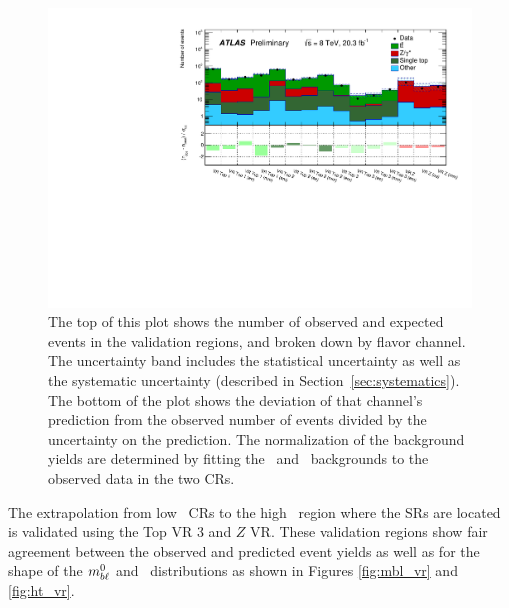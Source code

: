 \begin{figure}[ht]
\centering
\includegraphics[width=\textwidth]{figs/blstop/histpull_VR_detailed.pdf}
\caption{The top of this plot shows the number of observed and expected
  events in the validation regions, and broken down by flavor channel.
  The uncertainty band includes the statistical uncertainty as well as the
  systematic uncertainty (described in Section~\ref{sec:systematics}). The
  bottom of the plot shows the deviation of that channel's prediction
  from the observed number of events divided by the uncertainty on the
  prediction. The normalization of the background yields are determined
  by fitting the \TTBAR\ and \ZGAMMAJETS\ backgrounds to the observed
  data in the two CRs.
}
\label{fig:pull_dist_vr}
\end{figure}

The extrapolation from low \HT\ CRs to the high \HT\ region
where the SRs are located is validated using the Top VR 3
and $Z$ VR. These validation regions show fair
agreement between the observed and predicted event yields as well as
for the shape of the $m_{b\ell}^{0}$ and \HT\ distributions as shown in
Figures \ref{fig:mbl_vr} and \ref{fig:ht_vr}.

